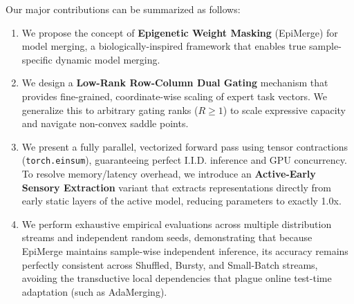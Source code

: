 Our major contributions can be summarized as follows:
\begin{enumerate}
    \item We propose the concept of \textbf{Epigenetic Weight Masking} (EpiMerge) for model merging, a biologically-inspired framework that enables true sample-specific dynamic model merging.
    \item We design a \textbf{Low-Rank Row-Column Dual Gating} mechanism that provides fine-grained, coordinate-wise scaling of expert task vectors. We generalize this to arbitrary gating ranks ($R \ge 1$) to scale expressive capacity and navigate non-convex saddle points.
    \item We present a fully parallel, vectorized forward pass using tensor contractions (\texttt{torch.einsum}), guaranteeing perfect I.I.D. inference and GPU concurrency. To resolve memory/latency overhead, we introduce an \textbf{Active-Early Sensory Extraction} variant that extracts representations directly from early static layers of the active model, reducing parameters to exactly 1.0x.
    \item We perform exhaustive empirical evaluations across multiple distribution streams and independent random seeds, demonstrating that because EpiMerge maintains sample-wise independent inference, its accuracy remains perfectly consistent across Shuffled, Bursty, and Small-Batch streams, avoiding the transductive local dependencies that plague online test-time adaptation (such as AdaMerging).
\end{enumerate}
